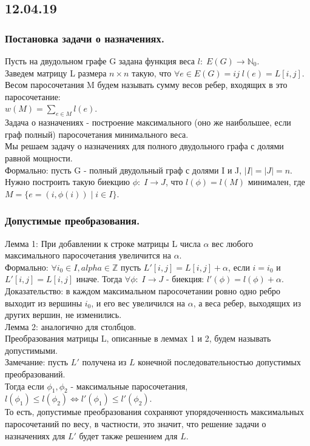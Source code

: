 \subsection{12.04.19}
\subsubsection{Постановка задачи о назначениях.}
Пусть на двудольном графе G задана функция веса $l: \; E(G) \rightarrow \mathbb{N}_0$.\\
Заведем матрицу L размера $n \times n$ такую, что $\forall e \in E(G) = ij \; l(e) = L[i,j]$.\\
Весом паросочетания M будем называть сумму весов ребер, входящих в это паросочетание:\\
$w(M) = \sum\limits_{e \in M}l(e)$.\\
Задача о назначениях - построение максимального (оно же наибольшее, если граф полный) паросочетания минимального веса.\\
Мы решаем задачу о назначениях для полного двудольного графа с долями равной мощности.\\
Формально: пусть G - полный двудольный граф с долями I и J, $|I| = |J| = n$.\\
Нужно построить такую биекцию $\phi: \; I \rightarrow J$, что $l(\phi) = l(M)$ минимален, где $M = \{e = (i,\phi(i)) \; | \; i \in I\}$.\\
\subsubsection{Допустимые преобразования.}
Лемма 1: При добавлении к строке матрицы L числа $\alpha$ вес любого максимального паросочетания увеличится на $\alpha$.\\
Формально: $\forall i_0 \in I, alpha \in \mathbb{Z}$ пусть $L'[i, j] = L[i, j] + \alpha$, если $i = i_0$ и $L'[i,j] = L[i, j]$ иначе. Тогда $\forall \phi: \; I \rightarrow J$ - биекция: $l'(\phi) = l(\phi) + \alpha$.\\
Доказательство: в каждом максимальном паросочетании ровно одно ребро выходит из вершины $i_0$, и его вес увеличился на $\alpha$, а веса ребер, выходящих из других вершин, не изменились.\\
Лемма 2: аналогично для столбцов.\\
Преобразования матрицы L, описанные в леммах 1 и 2, будем называть допустимыми.\\
Замечание: пусть $L'$ получена из $L$ конечной последовательностью допустимых преобразований.\\
Тогда если $\phi_1, \phi_2$ - максимальные паросочетания, $l(\phi_1) \leq l(\phi_2) \Leftrightarrow l'(\phi_1) \leq l'(\phi_2)$.\\
То есть, допустимые преобразования сохраняют упорядоченность максимальных паросочетаний по весу, в частности, это значит, что решение задачи о назначениях для $L'$ будет также решением для $L$.\\
